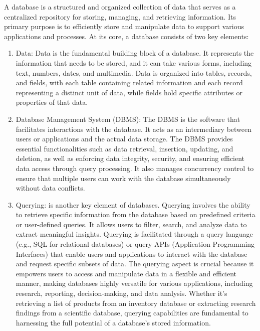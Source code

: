 A database is a structured and organized collection of data that serves as a centralized repository for storing, managing, and retrieving information. Its primary purpose is to efficiently store and manipulate data to support various applications and processes. At its core, a database consists of two key elements:

\begin{enumerate}
    \item Data: Data is the fundamental building block of a database. It represents the information that needs to be stored, and it can take various forms, including text, numbers, dates, and multimedia. Data is organized into tables, records, and fields, with each table containing related information and each record representing a distinct unit of data, while fields hold specific attributes or properties of that data.
    \item Database Management System (DBMS): The DBMS is the software that facilitates interactions with the database. It acts as an intermediary between users or applications and the actual data storage. The DBMS provides essential functionalities such as data retrieval, insertion, updating, and deletion, as well as enforcing data integrity, security, and ensuring efficient data access through query processing. It also manages concurrency control to ensure that multiple users can work with the database simultaneously without data conflicts.
    \item Querying: is another key element of databases. Querying involves the ability to retrieve specific information from the database based on predefined criteria or user-defined queries. It allows users to filter, search, and analyze data to extract meaningful insights. Querying is facilitated through a query language (e.g., SQL for relational databases) or query APIs (Application Programming Interfaces) that enable users and applications to interact with the database and request specific subsets of data. The querying aspect is crucial because it empowers users to access and manipulate data in a flexible and efficient manner, making databases highly versatile for various applications, including research, reporting, decision-making, and data analysis. Whether it's retrieving a list of products from an inventory database or extracting research findings from a scientific database, querying capabilities are fundamental to harnessing the full potential of a database's stored information.
\end{enumerate}

